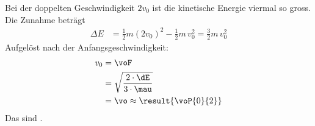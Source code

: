 Bei der doppelten Geschwindigkeit $2v_0$ ist die kinetische Energie viermal so gross. Die Zunahme beträgt
\begin{align}
 \Delta E &= \frac{1}{2}m\left(2v_0\right)^2-\frac{1}{2}m\,v_0^2 = \frac{3}{2}m\,v_0^2
\end{align}
Aufgelöst nach der Anfangsgeschwindigkeit:
\begin{align}
 v_0 &= \voF \\
   &= \sqrt{\frac{2\cdot\dE}{3\cdot\mau}} \\
   &= \vo \approx \result{\voP{0}{2}}
\end{align}
Das sind .
